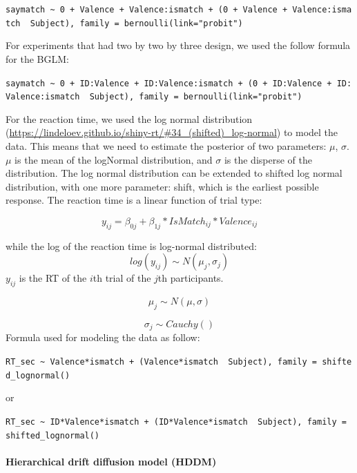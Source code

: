 \documentclass[
  english,
  man]{apa6}
\let\oldparagraph\paragraph
\renewcommand{\paragraph}[1]{\oldparagraph{#1}\mbox{}}
\begin{document}
\texttt{saymatch\ \textasciitilde{}\ 0\ +\ Valence\ +\ Valence:ismatch\ +\ (0\ +\ Valence\ +\ Valence:ismatch\ \textbar{}\ Subject),\ family\ =\ bernoulli(link="probit")}

For experiments that had two by two by three design, we used the follow formula for the BGLM:

\texttt{saymatch\ \textasciitilde{}\ 0\ +\ ID:Valence\ +\ ID:Valence:ismatch\ +\ (0\ +\ ID:Valence\ +\ ID:Valence:ismatch\ \textbar{}\ Subject),\ family\ =\ bernoulli(link="probit")}

For the reaction time, we used the log normal distribution (\url{https://lindeloev.github.io/shiny-rt/\#34_(shifted)_log-normal}) to model the data. This means that we need to estimate the posterior of two parameters: \(\mu\), \(\sigma\). \(\mu\) is the mean of the logNormal distribution, and \(\sigma\) is the disperse of the distribution. The log normal distribution can be extended to shifted log normal distribution, with one more parameter: shift, which is the earliest possible response. The reaction time is a linear function of trial type:

\[y_{ij} = \beta_{0j} + \beta_{1j}*IsMatch_{ij} * Valence_{ij}\]

while the log of the reaction time is log-normal distributed:
\[ log(y_{ij}) \sim N(\mu_{j}, \sigma_{j})\]
\(y_{ij}\) is the RT of the \(i\)th trial of the \(j\)th participants.

\[\mu_{j} \sim N(\mu, \sigma)\]

\[\sigma_{j} \sim Cauchy()\]
Formula used for modeling the data as follow:

\texttt{RT\_sec\ \textasciitilde{}\ Valence*ismatch\ +\ (Valence*ismatch\ \textbar{}\ Subject),\ family\ =\ shifted\_lognormal()}

or

\texttt{RT\_sec\ \textasciitilde{}\ ID*Valence*ismatch\ +\ (ID*Valence*ismatch\ \textbar{}\ Subject),\ family\ =\ shifted\_lognormal()}

\hypertarget{hierarchical-drift-diffusion-model-hddm}{%
\paragraph{Hierarchical drift diffusion model (HDDM)}\label{hierarchical-drift-diffusion-model-hddm}}
\end{document}
